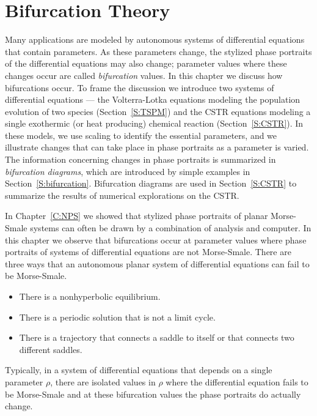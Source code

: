 \chapter{Bifurcation Theory}
\label{C:BT}

\normalsize

Many applications are modeled by autonomous systems of differential 
equations that contain parameters. As these parameters
change, the stylized phase portraits of the differential
equations may also change; parameter values where these
changes occur are called {\em bifurcation\/} 
values.  In this chapter we discuss how bifurcations occur.  To frame  
the discussion we introduce two systems of differential equations --- the 
Volterra-Lotka equations modeling the population evolution of two 
species (Section~\ref{S:TSPM}) and the CSTR equations 
modeling a single exothermic (or heat producing) chemical reaction (Section~\ref{S:CSTR}).  In these models, we use scaling to identify the 
essential parameters, and we illustrate changes that can take place in 
phase portraits as a parameter is varied.  The information concerning 
changes in phase portraits is summarized in {\em bifurcation diagrams}, 
which are introduced by simple examples in Section~\ref{S:bifurcation}. 
Bifurcation diagrams are used in Section~\ref{S:CSTR} to summarize the 
results of numerical explorations on the CSTR.

In Chapter~\ref{C:NPS} we showed that stylized phase portraits of planar 
Morse-Smale  systems can often be drawn by a 
combination of analysis and computer.  In this chapter we observe that 
bifurcations occur at parameter values where phase portraits of systems of 
differential equations are not Morse-Smale.  There are three ways that an 
autonomous planar system of differential equations can fail to be 
Morse-Smale.
\begin{itemize}
\item  There is a nonhyperbolic equilibrium. 
\item  There is a periodic solution that is not a limit cycle.
\item  There is a trajectory that connects a saddle to itself or
that connects two different saddles.  
\end{itemize}
Typically, in a system of differential equations that depends on a single
parameter $\rho$, there are isolated values in $\rho$ where the 
differential equation fails to be Morse-Smale and at these bifurcation
values the phase portraits do actually change.

